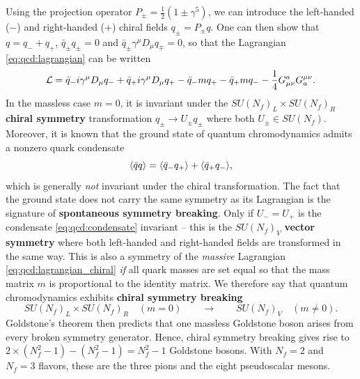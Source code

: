 Using the projection operator $P_\pm = \frac12 (1 \pm \gamma^5)$, we can introduce the left-handed ($-$) and right-handed ($+$) chiral fields $q_\pm = P_\pm q$.
One can then show that $q = q_- + q_+$, $\bar{q}_\pm q_\pm = 0$ and $\bar{q}_\pm \gamma^\mu D_\mu q_\mp = 0$, so that the Lagrangian \eqref{eq:qcd:lagrangian} can be written
\begin{equation}
	\mathcal{L} = \bar{q}_- i \gamma^\mu D_\mu q_- + \bar{q}_+ i \gamma^\mu D_\mu q_+ - \bar{q}_- m q_+ - \bar{q}_+ m q_- - \frac14 G_{\mu\nu}^a G^{\mu\nu}_a.
\label{eq:qcd:lagrangian_chiral}
\end{equation}
In the massless case $m=0$,
it is invariant under the $SU(N_f)_L \times SU(N_f)_R$ \textbf{chiral symmetry} transformation $q_\pm \rightarrow U_\pm q_\pm$ where both $U_\pm \in SU(N_f)$.
Moreover, it is known that the ground state of quantum chromodynamics admits a nonzero quark condensate \cite[chapter 28]{ref:schwartz}
\begin{equation}
	\avg{\bar{q} q} %
	                                                            = \avg{\bar{q}_- q_+} + \avg{\bar{q}_+ q_-},
\label{eq:qcd:condensate}
\end{equation}
which is generally \emph{not} invariant under the chiral transformation.
The fact that the ground state does not carry the same symmetry as its Lagrangian is the signature of \textbf{spontaneous symmetry breaking}.
Only if $U_- = U_+$ is the condensate \eqref{eq:qcd:condensate} invariant -- this is the $SU(N_f)_V$ \textbf{vector symmetry} where both left-handed and right-handed fields are transformed in the same way.
This is also a symmetry of the \emph{massive} Lagrangian \eqref{eq:qcd:lagrangian_chiral} \emph{if} all quark masses are set equal so that the mass matrix $m$ is proportional to the identity matrix.
We therefore say that quantum chromodynamics exhibits \textbf{chiral symmetry breaking}
\begin{equation}
	SU(N_f)_L \times SU(N_f)_R \quad (m = 0) \qquad \longrightarrow \qquad SU(N_f)_V \quad (m \neq 0).
\label{eq:qcd:symmetry_breaking_pattern}
\end{equation}
Goldstone's theorem then predicts that one massless Goldstone boson arises from every broken symmetry generator.
Hence, chiral symmetry breaking gives rise to $2 \times (N_f^2 - 1) - (N_f^2 - 1) = N_f^2 - 1$ Goldstone bosons.
With $N_f = 2$ and $N_f = 3$ flavors, these are the three pions and the eight pseudoscalar mesons.

